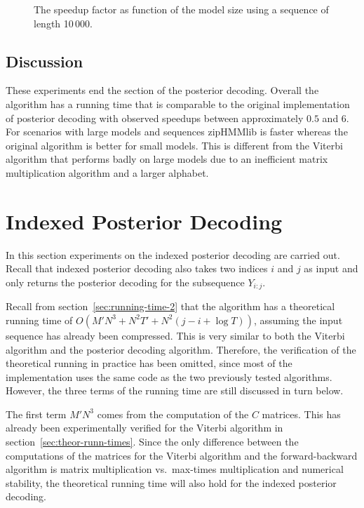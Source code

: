 \begin{figure}
  \centering
  
  \caption{The speedup factor as function of the model size using a sequence
    of length 10\,000.}
  \label{fig:posterior_speedup_vs_N}
\end{figure}

\subsection{Discussion}

These experiments end the section of the posterior decoding. Overall the
algorithm has a running time that is comparable to the original implementation
of posterior decoding with observed speedups between approximately $0.5$ and 6.
For scenarios with large models and sequences zipHMMlib is faster whereas the
original algorithm is better for small models. This is different from the
Viterbi algorithm that performs badly on large models due to an inefficient
matrix multiplication algorithm and a larger alphabet.

\section{Indexed Posterior Decoding}

In this section experiments on the indexed posterior decoding are carried out.
Recall that indexed posterior decoding also takes two indices $i$ and $j$ as
input and only returns the posterior decoding for the subsequence $Y_{i:j}$.

Recall from section~\ref{sec:running-time-2} that the algorithm has a
theoretical running time of $O(M' N^3 + N^2 T' + N^2 (j - i + \log T))$,
assuming the input sequence has already been compressed. This is very similar
to both the Viterbi algorithm and the posterior decoding algorithm. Therefore,
the verification of the theoretical running in practice has been omitted, since
most of the implementation uses the same code as the two previously tested
algorithms. However, the three terms of the running time are still discussed in
turn below.

The first term $M' N^3$ comes from the computation of the $C$ matrices. This
has already been experimentally verified for the Viterbi algorithm in
section~\ref{sec:theor-runn-times}. Since the only difference between the
computations of the matrices for the Viterbi algorithm and the forward-backward
algorithm is matrix multiplication vs.\ max-times multiplication and numerical
stability, the theoretical running time will also hold for the indexed posterior
decoding.

